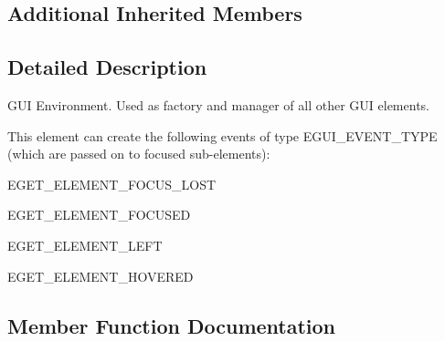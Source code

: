 \subsection*{Additional Inherited Members}


\subsection{Detailed Description}
G\+UI Environment. Used as factory and manager of all other G\+UI elements. 

\begin{DoxyParagraph}{This element can create the following events of type E\+G\+U\+I\+\_\+\+E\+V\+E\+N\+T\+\_\+\+T\+Y\+PE (which are passed on to focused sub-\/elements)\+:}
\begin{DoxyItemize}
\item E\+G\+E\+T\+\_\+\+E\+L\+E\+M\+E\+N\+T\+\_\+\+F\+O\+C\+U\+S\+\_\+\+L\+O\+ST \item E\+G\+E\+T\+\_\+\+E\+L\+E\+M\+E\+N\+T\+\_\+\+F\+O\+C\+U\+S\+ED \item E\+G\+E\+T\+\_\+\+E\+L\+E\+M\+E\+N\+T\+\_\+\+L\+E\+FT \item E\+G\+E\+T\+\_\+\+E\+L\+E\+M\+E\+N\+T\+\_\+\+H\+O\+V\+E\+R\+ED \end{DoxyItemize}

\end{DoxyParagraph}


\subsection{Member Function Documentation}
\mbox{\label{classirr_1_1gui_1_1IGUIEnvironment_a666749b7352a677c74acb242199e54a0}} 
